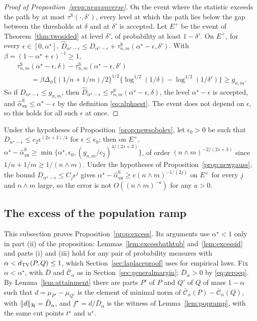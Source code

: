 \begin{proof}[Proof of Proposition~\ref{prop:newconverse}]
On the event where the statistic exceeds the path by at most $\tau^{\mathrm S}(\cdot,\delta')$, every level at which
the path lies below the gap between the thresholds at $\delta$ and at $\delta'$ is accepted. Let $E^+$ be the event of Theorem~\ref{thm:twosided} at level $\delta'$, of probability at least $1-\delta'$. On $E^+$, for every
$\epsilon\in[0,\alpha^\star]$, $\widehat D_{\alpha^\star-\epsilon}\le D_{\alpha^\star-\epsilon}+\tau^{\mathrm S}_{n,m}(\alpha^\star-\epsilon,\delta')$. With
$\beta=(1-\alpha^\star+\epsilon)^{-1}\ge1$,
\begin{align*}
&\tau^{\mathrm S}_{n,m}(\alpha^\star-\epsilon,\delta)-\tau^{\mathrm S}_{n,m}(\alpha^\star-\epsilon,\delta')\\
&\qquad=\beta\Delta_\phi\{(1/n+1/m)/2\}^{1/2}\{\log^{1/2}(1/\delta)-\log^{1/2}(1/\delta')\}\ge g_{n,m} .
\end{align*}
So if $D_{\alpha^\star-\epsilon}\le g_{n,m}$, then $\widehat D_{\alpha^\star-\epsilon}\le\tau^{\mathrm S}_{n,m}(\alpha^\star-\epsilon,\delta)$, the level
$\alpha^\star-\epsilon$ is accepted, and $\widehat\alpha_{\mathrm{an}}^{\mathrm S}\le\alpha^\star-\epsilon$ by the definition \eqref{eq:alphaest}. The event does
not depend on $\epsilon$, so this holds for all such $\epsilon$ at once.
\end{proof}

Under the hypotheses of Proposition~\ref{prop:newsobolev}, let $\epsilon_0>0$ be such that
$D_{\alpha^\star-\epsilon}\le c_2\epsilon^{(2s+3)/4}$ for $\epsilon\le\epsilon_0$; then on $E^+$,
$\alpha^\star-\widehat\alpha_{\mathrm{an}}^{\mathrm S}\ge\min\{\alpha^\star,\epsilon_0,(g_{n,m}/c_2)^{4/(2s+3)}\}$, of order $(n\wedge m)^{-2/(2s+3)}$ since
$1/n+1/m\ge1/(n\wedge m)$. Under the hypotheses of Proposition~\ref{prop:newgauss}, the bound
$D_{\alpha^\star-\epsilon}\le C_j\epsilon^j$ gives $\alpha^\star-\widehat\alpha_{\mathrm{an}}^{\mathrm S}\ge c(n\wedge m)^{-1/(2j)}$ on $E^+$ for every
$j$ and $n\wedge m$ large, so the error is not $O((n\wedge m)^{-a})$ for any $a>0$.

\subsection{The excess of the population ramp}
\label{sec:excessproofs}

This subsection proves Proposition~\ref{prop:excess}. Its arguments use $\alpha^\star<1$ only in part (ii) of the
proposition: Lemmas~\ref{lem:excessbathtub} and~\ref{lem:excessid} and parts (i) and (iii) hold for any pair of
probability measures with $\alpha<d_{\mathrm{TV}}(P,Q)\le1$, which Section~\ref{sec:laplaceproof} uses for empirical laws. Fix
$\alpha<\alpha^\star$, with $\bar D$ and $\bar{\mathcal C}_\alpha$ as in
Section~\ref{sec:generalmargin}; $\bar D_\alpha>0$ by \eqref{eq:zeroeq}. By Lemma~\ref{lem:attainment} there are parts
$P'$ of $P$ and $Q'$ of $Q$ of mass $1-\alpha$ such that
$d=\mu_{P'}-\mu_{Q'}$ is the element of minimal norm of $\bar{\mathcal C}_\alpha(P)-\bar{\mathcal C}_\alpha(Q)$, with $\|d\|_{\mathcal{H}}=\bar D_\alpha$, and
$f^\star=d/\bar D_\alpha$ is the witness of Lemma~\ref{lem:popramp}, with the same cut points $t^\star$ and $u^\star$.

